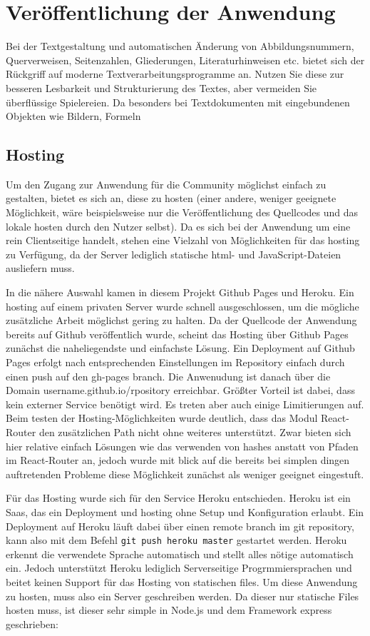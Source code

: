 \chapter{Veröffentlichung der Anwendung}
\thispagestyle{fancy}

Bei der Textgestaltung und automatischen Änderung von Abbildungsnummern, Querverweisen,
Seitenzahlen, Gliederungen, Literaturhinweisen etc. bietet sich der Rückgriff
auf moderne Textverarbeitungsprogramme an. Nutzen Sie diese zur besseren Lesbarkeit
und Strukturierung des Textes, aber vermeiden Sie überflüssige Spielereien. Da
besonders bei Textdokumenten mit eingebundenen Objekten wie Bildern, Formeln

\section{Hosting}
Um den Zugang zur Anwendung für die Community möglichst einfach zu gestalten, bietet es sich an, diese zu hosten (einer andere, weniger geeignete Möglichkeit, wäre beispielsweise nur die Veröffentlichung des Quellcodes und das lokale hosten durch den Nutzer selbst).
Da es sich bei der Anwendung um eine rein Clientseitige handelt, stehen eine Vielzahl von Möglichkeiten für das hosting zu Verfügung, da der Server lediglich statische html- und JavaScript-Dateien ausliefern muss.

In die nähere Auswahl kamen in diesem Projekt Github Pages und Heroku. Ein hosting auf einem privaten Server wurde schnell ausgeschlossen, um die mögliche zusätzliche Arbeit möglichst gering zu halten.
Da der Quellcode der Anwendung bereits auf Github veröffentlich wurde, scheint das Hosting über Github Pages zunächst die naheliegendste und einfachste Lösung. Ein Deployment auf Github Pages erfolgt nach entsprechenden Einstellungen im Repository einfach durch einen push auf den gh-pages branch. Die Anwenudung ist danach über die Domain username.github.io/rpository erreichbar. Größter Vorteil ist dabei, dass kein externer Service benötigt wird. Es treten aber auch einige Limitierungen auf. Beim testen der Hosting-Möglichkeiten wurde deutlich, dass das Modul React-Router den zusätzlichen Path nicht ohne weiteres unterstützt. Zwar bieten sich hier relative einfach Lösungen wie das verwenden von hashes anstatt von Pfaden im React-Router an, jedoch wurde mit blick auf die bereits bei simplen dingen auftretenden Probleme diese Möglichkeit zunächst als weniger geeignet eingestuft.

Für das Hosting wurde sich für den Service Heroku entschieden. Heroku ist ein Saas, das ein Deployment und hosting ohne Setup und Konfiguration erlaubt. Ein Deployment auf Heroku läuft dabei über einen remote branch im git repository, kann also mit dem Befehl \verb|git push heroku master| gestartet werden. Heroku erkennt die verwendete Sprache automatisch und stellt alles nötige automatisch ein.
Jedoch unterstützt Heroku lediglich Serverseitige Progrmmiersprachen und beitet keinen Support für das Hosting von statischen files. Um diese Anwendung zu hosten, muss also ein Server geschreiben werden. Da dieser nur statische Files hosten muss, ist dieser sehr simple in Node.js und dem Framework express geschrieben:

